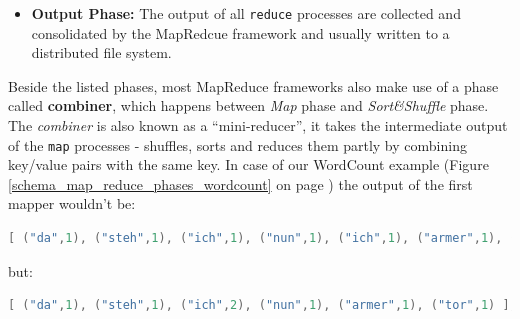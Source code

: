 {\begin{itemize}
\item \textbf{Output Phase:} The output of all \lstinline{reduce} processes are collected and consolidated by the MapRedcue framework and usually written to a distributed file system.\\
\end{itemize}

Beside the listed phases, most MapReduce frameworks also make use of a phase called \textbf{combiner}, which happens between \textit{Map} phase and \textit{Sort\&Shuffle} phase. The \textit{combiner} is also known as a ``mini-reducer'', it takes the intermediate output of the \lstinline{map} processes - shuffles, sorts and reduces them partly by combining key/value pairs with the same key. In case of our WordCount example (Figure \ref{schema_map_reduce_phases_wordcount} on page \pageref{schema_map_reduce_phases_wordcount}) the output of the first mapper wouldn't be:
\begin{lstlisting}[aboveskip=2ex, belowskip=2ex,emphstyle=\underbar, breaklines=true,frame=none,numbers=none,xleftmargin=0.05\textwidth,xrightmargin=0.05\textwidth,showstringspaces=false,language=java]
[ ("da",1), ("steh",1), ("ich",1), ("nun",1), ("ich",1), ("armer",1), ("tor",1) ];
\end{lstlisting}

but:
\begin{lstlisting}[aboveskip=2ex, belowskip=2ex,emphstyle=\underbar, breaklines=true,frame=none,numbers=none,xleftmargin=0.05\textwidth,xrightmargin=0.05\textwidth,showstringspaces=false,language=java]
[ ("da",1), ("steh",1), ("ich",2), ("nun",1), ("armer",1), ("tor",1) ];
\end{lstlisting}

}
